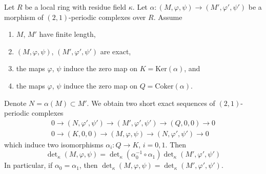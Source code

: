\begin{lemma}
\label{lemma-tricky}
Let $R$ be a local ring with residue field $\kappa$.
Let $\alpha : (M, \varphi, \psi) \to (M', \varphi', \psi')$
be a morphism of $(2, 1)$-periodic complexes over $R$.
Assume
\begin{enumerate}
\item $M$, $M'$ have finite length,
\item $(M, \varphi, \psi)$, $(M', \varphi', \psi')$ are exact,
\item the maps $\varphi$, $\psi$ induce the zero map on
$K = \text{Ker}(\alpha)$, and
\item the maps $\varphi$, $\psi$ induce the zero map on
$Q = \text{Coker}(\alpha)$.
\end{enumerate}
Denote $N = \alpha(M) \subset M'$. We obtain two short exact sequences
of $(2, 1)$-periodic complexes
$$
\begin{matrix}
0 \to (N, \varphi', \psi') \to (M', \varphi', \psi') \to (Q, 0, 0) \to 0 \\
0 \to (K, 0, 0) \to (M, \varphi, \psi) \to (N, \varphi', \psi') \to 0
\end{matrix}
$$
which induce two isomorphisms $\alpha_i : Q \to K$, $i = 0, 1$. Then
$$
\det\nolimits_\kappa(M, \varphi, \psi)
=
\det\nolimits_\kappa(\alpha_0^{-1} \circ \alpha_1)
\det\nolimits_\kappa(M', \varphi', \psi')
$$
In particular, if $\alpha_0 = \alpha_1$, then
$\det\nolimits_\kappa(M, \varphi, \psi) =
\det\nolimits_\kappa(M', \varphi', \psi')$.
\end{lemma}

